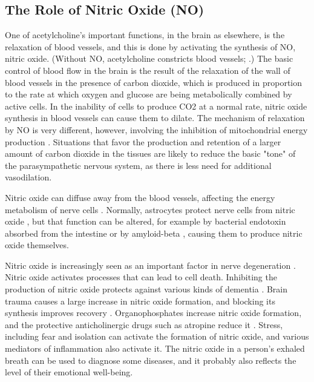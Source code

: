 \documentclass{article}
\begin{document}
\subsection{The Role of Nitric Oxide (NO)}
One of acetylcholine's important functions, in the brain as elsewhere, is the relaxation of blood vessels, and this is done by activating the synthesis of NO, nitric oxide. (Without NO, acetylcholine constricts blood vessels; \cite{Librizzi2000}.) The basic control of blood flow in the brain is the result of the relaxation of the wall of blood vessels in the presence of carbon dioxide, which is produced in proportion to the rate at which oxygen and glucose are being metabolically combined by active cells. In the inability of cells to produce CO2 at a normal rate, nitric oxide synthesis in blood vessels can cause them to dilate. The mechanism of relaxation by NO is very different, however, involving the inhibition of mitochondrial energy production \cite{Barron2001}. Situations that favor the production and retention of a larger amount of carbon dioxide in the tissues are likely to reduce the basic "tone" of the parasympathetic nervous system, as there is less need for additional vasodilation.

Nitric oxide can diffuse away from the blood vessels, affecting the energy metabolism of nerve cells \cite{Steinert2010}. Normally, astrocytes protect nerve cells from nitric oxide \cite{Chen2001}, but that function can be altered, for example by bacterial endotoxin absorbed from the intestine \cite{Sola2002} or by amyloid-beta \cite{Tran2001}, causing them to produce nitric oxide themselves.

Nitric oxide is increasingly seen as an important factor in nerve degeneration \cite{Doherty2011}. Nitric oxide activates processes \cite{Obukuro2013} that can lead to cell death. Inhibiting the production of nitric oxide protects against various kinds of dementia \cite{SharmaSharma2013, SharmaSingh2013}. Brain trauma causes a large increase in nitric oxide formation, and blocking its synthesis improves recovery \cite{Huttemann2008, Gahm2006}. Organophosphates increase nitric oxide formation, and the protective anticholinergic drugs such as atropine reduce it \cite{Chang2001, Kim1997}. Stress, including fear \cite{Campos2013} and isolation \cite{Zlatkovic2013} can activate the formation of nitric oxide, and various mediators of inflammation also activate it. The nitric oxide in a person's exhaled breath can be used to diagnose some diseases, and it probably also reflects the level of their emotional well-being.
\end{document}
